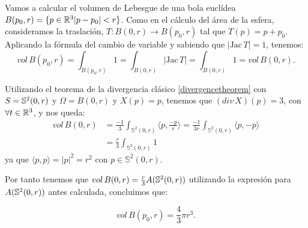 \begin{remark}
Vamos a calcular el volumen de Lebesgue de una bola euclídea $B(p_0,r)=\{ p \in \mathbb{R}^3 |p-p_0| < r \}$. Como en el cálculo del área de la esfera, consideramos la traslación, $T: B(0, r) \longrightarrow B(p_0, r)$ tal que $T(p) = p + p_0$. Aplicando la fórmula del cambio de variable y sabiendo que $|\text{Jac} \, T|=1$, tenemos:
%
\begin{equation*}
    vol \, B(p_0,r) = \int_{B(p_0,r)} 1 = \int_{B(0,r)} |\text{Jac} \, T| = \int_{B(0,r)} 1 = vol \, B(0,r).
\end{equation*}

Utilizando el teorema de la divergencia clásico \ref{divergencetheorem} con $S=\mathbb{S}^2(0,r)$ y $\Omega=B(0,r)$ y $X(p)=p$, tenemos que $(div \, X)(p)=3$, con $\forall t\in \mathbb{R}^3$, y nos queda:
%
\begin{align*}
    vol \, B(0,r) &= \frac{-1}{3} \int_{\mathbb{S}^2(0,r)}  \langle p, \frac{-p}{r} \rangle = \frac{-1}{3r} \int_{\mathbb{S}^2(0,r)}  \langle p, -p \rangle \\
    &= \frac{r}{3} \int_{\mathbb{S}^2(0,r)} 1
\end{align*}
%
ya que $ \langle p,p \rangle  = |p|^2 = r^2$ con $p \in \mathbb{S}^2(0,r)$.

Por tanto tenemos que $vol \, B(0,r) = \frac{r}{3}A(\mathbb{S}^2(0,r))$ utilizando la expresión para $A(\mathbb{S}^2(0,r))$ antes calculada, concluimos que:

\begin{equation*}
    vol \, B(p_0,r) = \frac{4}{3}\pi r^3.
\end{equation*}
\end{remark}

